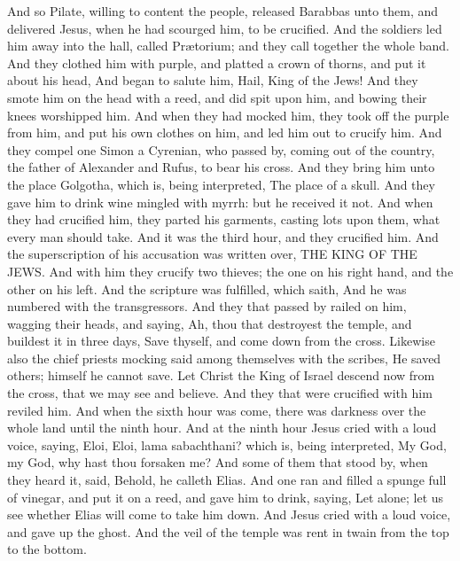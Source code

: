  And so Pilate, willing to content the people, released
Barabbas unto them, and delivered Jesus, when he had scourged him, to be
crucified.  And the soldiers led him away into the hall,
called Prætorium; and they call together the whole band. 
And they clothed him with purple, and platted a crown of thorns, and put
it about his head,  And began to salute him, Hail, King of
the Jews!  And they smote him on the head with a reed, and
did spit upon him, and bowing their knees worshipped him. 
And when they had mocked him, they took off the purple from him, and put
his own clothes on him, and led him out to crucify him. 
And they compel one Simon a Cyrenian, who passed by, coming out of the
country, the father of Alexander and Rufus, to bear his cross.
 And they bring him unto the place Golgotha, which is,
being interpreted, The place of a skull.  And they gave him
to drink wine mingled with myrrh: but he received it not. 
And when they had crucified him, they parted his garments, casting lots
upon them, what every man should take.  And it was the
third hour, and they crucified him.  And the superscription
of his accusation was written over, THE KING OF THE JEWS. 
And with him they crucify two thieves; the one on his right hand, and
the other on his left.  And the scripture was fulfilled,
which saith, And he was numbered with the transgressors. 
And they that passed by railed on him, wagging their heads, and saying,
Ah, thou that destroyest the temple, and buildest it in three days,
 Save thyself, and come down from the cross. 
Likewise also the chief priests mocking said among themselves with the
scribes, He saved others; himself he cannot save.  Let
Christ the King of Israel descend now from the cross, that we may see
and believe. And they that were crucified with him reviled him.
 And when the sixth hour was come, there was darkness over
the whole land until the ninth hour.  And at the ninth hour
Jesus cried with a loud voice, saying, Eloi, Eloi, lama sabachthani?
which is, being interpreted, My God, my God, why hast thou forsaken me?
 And some of them that stood by, when they heard it, said,
Behold, he calleth Elias.  And one ran and filled a spunge
full of vinegar, and put it on a reed, and gave him to drink, saying,
Let alone; let us see whether Elias will come to take him down.
 And Jesus cried with a loud voice, and gave up the ghost.
 And the veil of the temple was rent in twain from the top
to the bottom.

